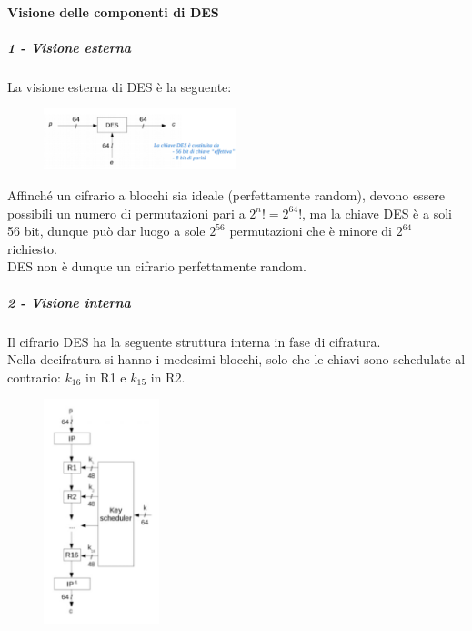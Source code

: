 \documentclass[a4paper,12pt]{article}
\begin{document}
\paragraph{Visione delle componenti di DES}
\subparagraph{1 - Visione esterna}
La visione esterna di DES è la seguente:
\begin{figure}[H]
	\centering
	\includegraphics[width=0.5\textwidth]{img/visione-esterna-des.png}
\end{figure}
Affinché un cifrario a blocchi sia ideale (perfettamente random), devono essere possibili un numero di permutazioni pari a $2^n!=2^64!$, ma la chiave DES è a soli 56 bit, dunque può dar luogo a sole $2^56$ permutazioni che è minore di $2^64$ richiesto. \\
DES non è dunque un cifrario perfettamente random.

\subparagraph{2 - Visione interna}
Il cifrario DES ha la seguente struttura interna in fase di cifratura. \\
Nella decifratura si hanno i medesimi blocchi, solo che le chiavi sono schedulate al contrario: $k_16$ in R1 e $k_15$ in R2.
\begin{figure}[H]
	\centering
	\includegraphics[width=0.3\textwidth]{img/visione-interna-des.png}
\end{figure}
\end{document}
